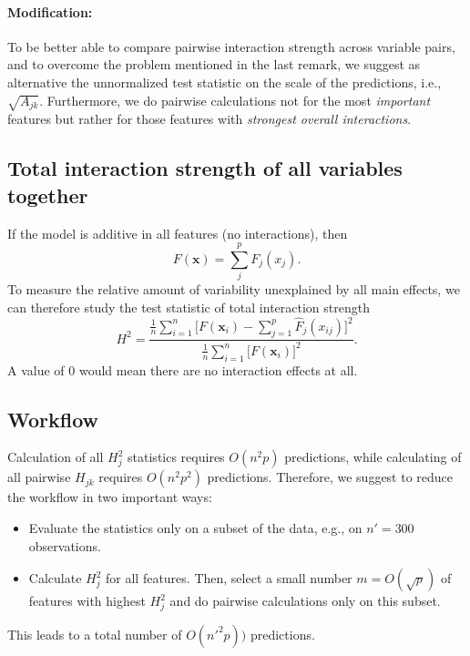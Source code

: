\documentclass[]{article}
\begin{document}
\paragraph{Modification:} To be better able to compare pairwise interaction strength across variable pairs, and to overcome the problem mentioned in the last remark, we suggest as alternative the unnormalized test statistic on the scale of the predictions, i.e., $\sqrt{A_{jk}}$. 
Furthermore, we do pairwise calculations not for the most {\em important} features but rather for those features with {\em strongest overall interactions}.

\subsection{Total interaction strength of all variables together}
If the model is additive in all features (no interactions), then
$$
	F(\mathbf{x}) = \sum_{j}^{p} F_j(x_j).
$$
To measure the relative amount of variability unexplained by all main effects, we can therefore study the test statistic of total interaction strength
$$
  H^2 = \frac{\frac{1}{n} \sum_{i = 1}^n \big[F(\mathbf{x}_i) - \sum_{j = 1}^p\hat F_j(x_{ij})\big]^2}{\frac{1}{n} \sum_{i = 1}^n\big[F(\mathbf{x}_i)\big]^2}.
$$
A value of 0 would mean there are no interaction effects at all.

\subsection{Workflow}
Calculation of all $H_j^2$ statistics requires $O(n^2p)$ predictions, while calculating of all pairwise $H_{jk}$ requires $O(n^2 p^2)$ predictions. Therefore, we suggest to reduce the workflow in two important ways:
\begin{itemize}
\item Evaluate the statistics only on a subset of the data, e.g., on $n' = 300$ observations.
\item Calculate $H_j^2$ for all features. Then, select a small number $m = O(\sqrt{p})$ of features with highest $H^2_j$ and do pairwise calculations only on this subset.
\end{itemize}
This leads to a total number of $O(n'^2 p))$ predictions.



\end{document}
